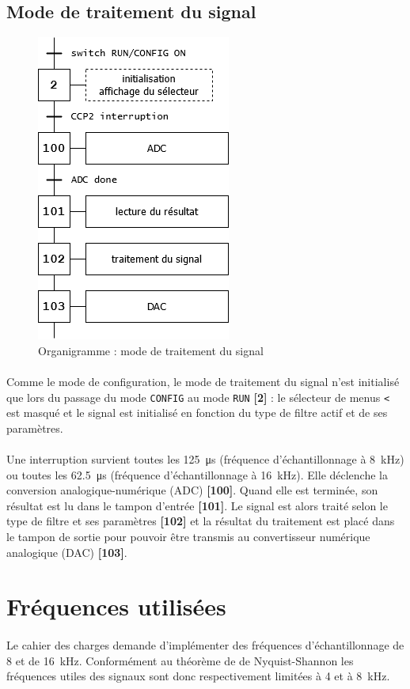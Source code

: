 \documentclass{article}
\begin{document}
    \subsection{Mode de traitement du signal}
    \begin{figure}[H]
        \centering
        \includegraphics[width=.2\textwidth]{./images/orga_run.png}
        \caption{Organigramme : mode de traitement du signal}
    \end{figure}

    \paragraph{}
    Comme le mode de configuration, le mode de traitement du signal n'est initialisé que lors du passage du mode \texttt{CONFIG} au mode \texttt{RUN} \textbf{[2]} : le sélecteur de menus \texttt{<} est masqué et le signal est initialisé en fonction du type de filtre actif et de ses paramètres.

    \paragraph{}
    Une interruption survient toutes les \SI{125}{\micro\second} (fréquence d'échantillonnage à \SI{8}{\kilo\hertz}) ou toutes les \SI{62,5}{\micro\second} (fréquence d'échantillonnage à \SI{16}{\kilo\hertz}). Elle déclenche la conversion analogique-numérique (ADC) \textbf{[100]}. Quand elle est terminée, son résultat est lu dans le tampon d'entrée \textbf{[101]}. Le signal est alors traité selon le type de filtre et ses paramètres \textbf{[102]} et la résultat du traitement est placé dans le tampon de sortie pour pouvoir être transmis au convertisseur numérique analogique (DAC) \textbf{[103]}.



    \section{Fréquences utilisées}
    \paragraph{}
    Le cahier des charges demande d'implémenter des fréquences d'échantillonnage de 8 et de \SI{16}{\kilo\hertz}. Conformément au théorème de de Nyquist-Shannon les fréquences utiles des signaux sont donc respectivement limitées à 4 et à \SI{8}{\kilo\hertz}.
\end{document}
